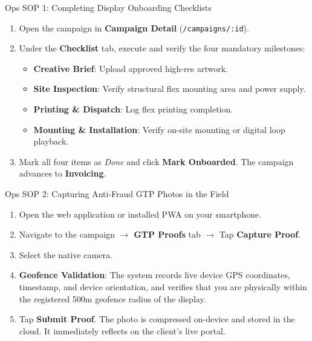 \documentclass[11pt,a4paper]{article}
\begin{document}
\begin{sopbox}{Ops SOP 1: Completing Display Onboarding Checklists}
\begin{enumerate}[leftmargin=1.2em, itemsep=2pt]
    \item Open the campaign in \textbf{Campaign Detail} (\texttt{/campaigns/:id}).
    \item Under the \textbf{Checklist} tab, execute and verify the four mandatory milestones:
    \begin{itemize}[leftmargin=1em, itemsep=2pt]
        \item \textbf{Creative Brief}: Upload approved high-res artwork.
        \item \textbf{Site Inspection}: Verify structural flex mounting area and power supply.
        \item \textbf{Printing \& Dispatch}: Log flex printing completion.
        \item \textbf{Mounting \& Installation}: Verify on-site mounting or digital loop playback.
    \end{itemize}
    \item Mark all four items as \textit{Done} and click \textbf{Mark Onboarded}. The campaign advances to \textbf{Invoicing}.
\end{enumerate}
\end{sopbox}

\begin{sopbox}{Ops SOP 2: Capturing Anti-Fraud GTP Photos in the Field}
\begin{enumerate}[leftmargin=1.2em, itemsep=2pt]
    \item Open the web application or installed PWA on your smartphone.
    \item Navigate to the campaign $\rightarrow$ \textbf{GTP Proofs} tab $\rightarrow$ Tap \textbf{Capture Proof}.
    \item Select the native camera.
    \item \textbf{Geofence Validation}: The system records live device GPS coordinates, timestamp, and device orientation, and verifies that you are physically within the registered 500m geofence radius of the display.
    \item Tap \textbf{Submit Proof}. The photo is compressed on-device and stored in the cloud. It immediately reflects on the client's live portal.
\end{enumerate}
\end{sopbox}

\newpage
\end{document}

